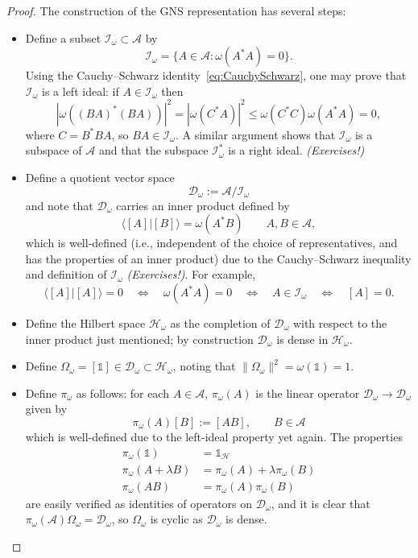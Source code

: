 \documentclass[12pt,a4paper]{article}
\newcommand{\1}{\mathds{1}}                         %
\newcommand{\HH}{{\mathcal{H}}}
\newcommand{\DD}{{\mathscr{D}}}
\newcommand{\II}{{\mathbb{1}}}
\newcommand{\Ac}{{\mathcal{A}}}
\newcommand{\Ic}{{\mathcal{I}}}
\newcommand{\ip}[2]{\langle #1|#2\rangle}
\begin{document}
\begin{proof}
	The construction of the GNS representation has several steps:
	\begin{itemize}
		\item Define a subset $\Ic_\omega\subset \Ac$ by 
		\[
		\Ic_\omega = \{A\in\Ac: \omega(A^*A)=0\}.
		\]
		Using the Cauchy--Schwarz identity~\eqref{eq:CauchySchwarz}, one may prove that $\Ic_\omega$ is a left ideal: if $A\in\Ic_\omega$ then
		\[
		|\omega((BA)^*(BA))|^2 = |\omega(C^*A)|^2\le \omega(C^*C)\omega(A^*A) = 0,
		\]
		where $C=B^*BA$, 
		so $BA\in\Ic_\omega$. A similar argument shows that $\Ic_\omega$ is a subspace of $\Ac$ and that
		the subspace $\Ic_\omega^*$ is a right ideal. \emph{(Exercises!)}
		\item Define a quotient vector space
		\[
		\DD_\omega :=\Ac/\Ic_\omega
		\]
		and note that $\DD_\omega$ carries an inner product defined by 
		\[
		\ip{[A]}{[B]} = \omega(A^*B) \qquad A,B\in\Ac,
		\]
		which is well-defined (i.e., independent of the choice of representatives, and has the properties of an inner product) due to the Cauchy--Schwarz inequality and definition of $\Ic_\omega$ \emph{(Exercises!)}. For example,
		\[
		\ip{[A]}{[A]} = 0\quad\iff\quad \omega(A^*A)=0\quad\iff\quad A\in\Ic_\omega \quad\iff\quad[A]=0.
		\] 
		\item Define the Hilbert space $\HH_\omega$ as the completion of $\DD_\omega$ with respect to the inner product just mentioned; by construction $\DD_\omega$ is dense in $\HH_\omega$. 
		\item Define $\Omega_\omega = [\II]\in\DD_\omega\subset\HH_\omega$, noting that
		$\|\Omega_\omega\|^2 = \omega(\II) = 1$.
		\item Define $\pi_\omega$ as follows: for each $A\in\Ac$, $\pi_\omega(A)$ is the linear operator $\DD_\omega\to\DD_\omega$ given by 
		\[
		\pi_\omega(A)[B] := [AB],\qquad B\in\Ac
		\]
		which is well-defined due to the left-ideal property yet again.
		The properties
		\begin{align*}
		\pi_\omega(\II) &= \II_\HH   \\
		\pi_\omega(A+\lambda B) &= \pi_\omega(A)+ \lambda\pi_\omega(B) \\
		\pi_\omega(AB) &= \pi_\omega(A)\pi_\omega(B) 
		\end{align*}
		are easily verified as identities of operators on $\DD_\omega$, and
		it is clear that $\pi_\omega(\Ac)\Omega_\omega=\DD_\omega$, so $\Omega_\omega$ is cyclic as $\DD_\omega$ is dense.
		

\end{itemize}
\end{proof}
\end{document}
